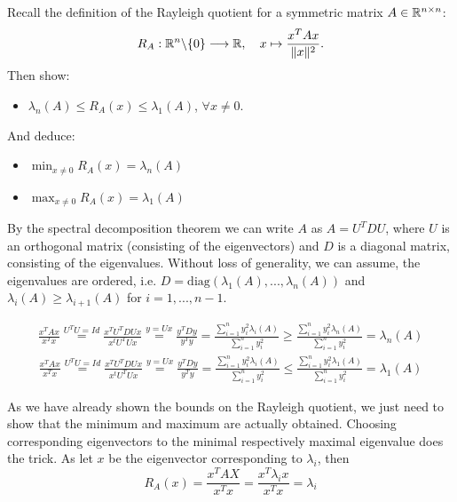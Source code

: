\documentclass{ExerciseSheet}
\newif\ifsolutions
\begin{document}


\vskip 0.5cm 
\begin{problem}
Recall the definition of the Rayleigh quotient for a symmetric matrix $A\in \mathbb{R}^{n \times n}$:
\begin{equation*}
    R_A: \mathbb{R}^n\backslash \{0\} \longrightarrow \mathbb{R}, \quad x \mapsto  \frac{x^T A x}{\|x\|^2}.
\end{equation*}
Then show: 
\begin{itemize}
    \item $\lambda_n(A) \leq R_A(x) \leq \lambda_1(A)$, $\forall x\neq 0$.
\end{itemize}
And deduce: 
\begin{itemize}
    \item $\min_{x\neq 0} R_A(x)=\lambda_n(A)$
    \item  $\max_{x\neq 0} R_A(x)=\lambda_1(A)$
\end{itemize}
\end{problem}

\ifsolutions
\vskip 0.3cm

\begin{solution}
By the spectral decomposition theorem we can write $A$ as $A=U^TDU$, where $U$ is an orthogonal matrix (consisting of the eigenvectors) and $D$ is a diagonal matrix, consisting of the eigenvalues. Without loss of generality, we can assume, the eigenvalues are ordered, i.e. $D=\text{diag}(\lambda_1(A), ..., \lambda_n(A))$ and $\lambda_i(A) \geq \lambda_{i+1}(A)$ for $i=1,...,n-1$.

\begin{align*}
    \frac{x^TA x}{x^Tx} \overset{U^TU=Id}{=} \frac{x^TU^TDUx}{x^tU^TUx} \overset{y=Ux}{=} \frac{y^TDy}{y^Ty} = \frac{\sum_{i=1}^n y_i^2 \lambda_i(A)} {\sum_{i=1}^n y_i^2} \geq \frac{\sum_{i=1}^n y_i^2 \lambda_n(A)} {\sum_{i=1}^n y_i^2} = \lambda_n(A)
\end{align*}
\begin{align*}
    \frac{x^TA x}{x^Tx} \overset{U^TU=Id}{=} \frac{x^TU^TDUx}{x^tU^TUx} \overset{y=Ux}{=} \frac{y^TDy}{y^Ty} = \frac{\sum_{i=1}^n y_i^2 \lambda_i(A)} {\sum_{i=1}^n y_i^2} \leq \frac{\sum_{i=1}^n y_i^2 \lambda_1(A)} {\sum_{i=1}^n y_i^2} = \lambda_1(A)
\end{align*}

As we have already shown the bounds on the Rayleigh quotient, we just need to show that the minimum and maximum are actually obtained. Choosing corresponding eigenvectors to the minimal respectively maximal eigenvalue does the trick. 
As let $x$ be the eigenvector corresponding to $\lambda_i$, then $$R_A(x)=\frac{x^TAX}{x^Tx}=\frac{x^T\lambda_i x}{x^Tx}= \lambda_i$$

\end{solution}
\end{document}
